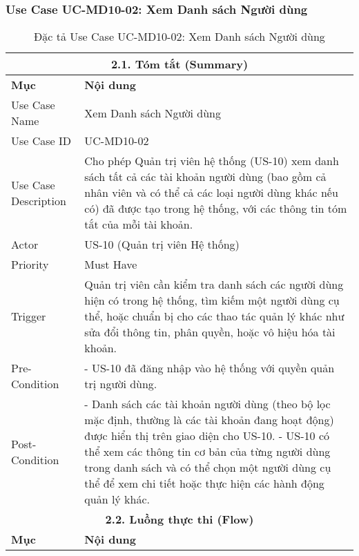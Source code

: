 \subsubsection{Use Case UC-MD10-02: Xem Danh sách Người dùng}
\begin{longtable}{|m{4cm}|p{11cm}|}
\caption{Đặc tả Use Case UC-MD10-02: Xem Danh sách Người dùng} \label{tab:uc_md10_02_full_v2_latex_fixed_in_codeblock} \\
\hline
\multicolumn{2}{|c|}{\textbf{2.1. Tóm tắt (Summary)}} \\
\hline
\textbf{Mục} & \textbf{Nội dung} \\
\hline
\endhead %
\midrule
\endfoot %
\bottomrule
\endlastfoot %
Use Case Name & Xem Danh sách Người dùng \\
\hline
Use Case ID & UC-MD10-02 \\
\hline
Use Case Description & Cho phép Quản trị viên hệ thống (US-10) xem danh sách tất cả các tài khoản người dùng (bao gồm cả nhân viên và có thể cả các loại người dùng khác nếu có) đã được tạo trong hệ thống, với các thông tin tóm tắt của mỗi tài khoản. \\
\hline
Actor & US-10 (Quản trị viên Hệ thống) \\
\hline
Priority & Must Have \\
\hline
Trigger & Quản trị viên cần kiểm tra danh sách các người dùng hiện có trong hệ thống, tìm kiếm một người dùng cụ thể, hoặc chuẩn bị cho các thao tác quản lý khác như sửa đổi thông tin, phân quyền, hoặc vô hiệu hóa tài khoản. \\
\hline
Pre-Condition & - US-10 đã đăng nhập vào hệ thống với quyền quản trị người dùng. \\
\hline
Post-Condition & - Danh sách các tài khoản người dùng (theo bộ lọc mặc định, thường là các tài khoản đang hoạt động) được hiển thị trên giao diện cho US-10. \newline - US-10 có thể xem các thông tin cơ bản của từng người dùng trong danh sách và có thể chọn một người dùng cụ thể để xem chi tiết hoặc thực hiện các hành động quản lý khác. \\
\hline
\multicolumn{2}{|c|}{\textbf{2.2. Luồng thực thi (Flow)}} \\
\hline
\textbf{Mục} & \textbf{Nội dung} \\
\hline

\end{longtable}
